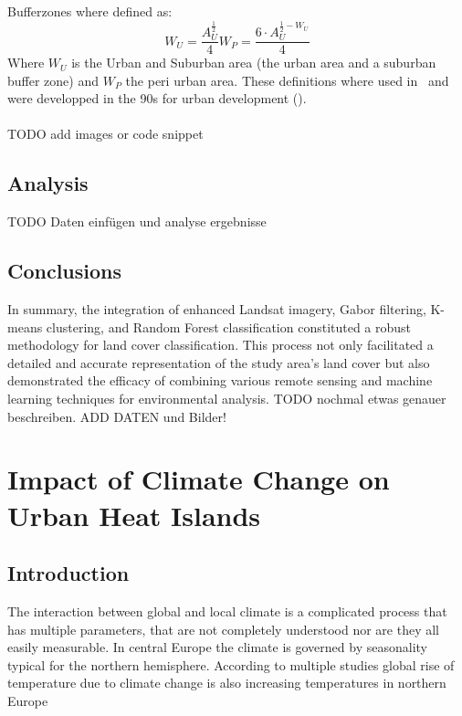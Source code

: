 \documentclass[12pt,a4paper, english]{article}
\begin{document}
    Bufferzones where defined as: 
    \begin{equation}
	    W_U = \frac{A_U^{\frac{1}{2}}}{4}
	    W_P = \frac{6\cdot A_U^{\frac{1}{2}-W_U}}{4}
    \end{equation}
    Where $W_U$ is the Urban and Suburban area (the urban area and a suburban buffer zone) and $W_P$ the peri urban area.
    These definitions where used in~\cite{Sobrino2020} and were developped in the 90s for urban development (\cite{AlkanBala2014}).
   \\ 
\\
    TODO add images or code snippet



 \subsection{Analysis}\label{sec:landcoverAnalysis}
TODO Daten einfügen und analyse ergebnisse
  \subsection{Conclusions}
In summary, the integration of enhanced Landsat imagery, Gabor filtering, K-means clustering, and Random Forest classification constituted a robust methodology for land cover classification.
This process not only facilitated a detailed and accurate representation of the study area's land cover but also demonstrated the efficacy of combining various remote sensing and machine learning techniques for environmental analysis.
TODO nochmal etwas genauer beschreiben. ADD DATEN und Bilder! 
%
\newpage

  \section{Impact of Climate Change on Urban Heat Islands}\label{sec:UHITempImp}
    \subsection{Introduction}
    The interaction between global and local climate is a complicated process that has multiple parameters, that are not completely understood nor are they all easily measurable. 
    In central Europe the climate is governed by seasonality typical for the northern hemisphere.  
    According to multiple studies global rise of temperature due to climate change is also increasing temperatures in northern Europe~\cite{Benestad2005}  %
\end{document}
